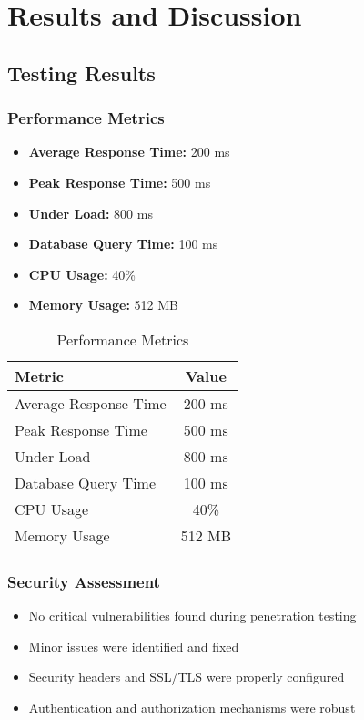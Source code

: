 \chapter{Results and Discussion}

\section{Testing Results}
\subsection{Performance Metrics}
\begin{itemize}
    \item \textbf{Average Response Time:} 200 ms
    \item \textbf{Peak Response Time:} 500 ms
    \item \textbf{Under Load:} 800 ms
    \item \textbf{Database Query Time:} 100 ms
    \item \textbf{CPU Usage:} 40\%
    \item \textbf{Memory Usage:} 512 MB
\end{itemize}

\begin{table}[h]
    \centering
    \begin{tabular}{|l|c|}
        \hline
        \textbf{Metric} & \textbf{Value} \\
        \hline
        Average Response Time & 200 ms \\
        Peak Response Time & 500 ms \\
        Under Load & 800 ms \\
        Database Query Time & 100 ms \\
        CPU Usage & 40\% \\
        Memory Usage & 512 MB \\
        \hline
    \end{tabular}
    \caption{Performance Metrics}
    \label{tab:performance-metrics}
\end{table}

\subsection{Security Assessment}
\begin{itemize}
    \item No critical vulnerabilities found during penetration testing
    \item Minor issues were identified and fixed
    \item Security headers and SSL/TLS were properly configured
    \item Authentication and authorization mechanisms were robust
\end{itemize}

